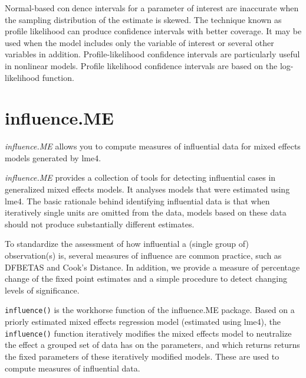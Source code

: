 \documentclass[12pt, a4paper]{report}
\theoremstyle{plain}
\theoremstyle{definition}
\theoremstyle{remark}
\begin{document}
	
	Normal-based condence intervals for a parameter of interest are inaccurate when the sampling 
	distribution of the estimate is skewed. The technique known as profile likelihood can produce confidence 
	intervals with better coverage. It may be used when the model includes only the variable of interest or 
	several other variables in addition.
	Profile-likelihood confidence intervals are particularly useful in nonlinear models. 
	Profile likelihood confidence intervals are based on the log-likelihood function.
	
	
	
	
	
	

	\section{influence.ME}
	
	\textit{influence.ME} allows you to compute measures of influential data for mixed effects models generated by lme4.
	
	\textit{influence.ME} provides a collection of tools for detecting influential cases in generalized mixed effects models. It analyses models that were estimated using lme4. The basic rationale behind identifying influential data is that when iteratively single units are omitted from the data, models based on these data should not produce substantially different estimates. 
	
	To standardize the assessment of how influential a (single group of) observation(s) is, several measures of influence are common practice, such as DFBETAS and Cook's Distance. In addition, we provide a measure of percentage change of the fixed point estimates and a simple procedure to detect changing levels of significance.
	
	\texttt{influence()} is the workhorse function of the influence.ME package. Based on a priorly estimated mixed effects regression model (estimated using lme4), the \texttt{influence()} function iteratively modifies the mixed effects model to neutralize the effect a grouped set of data has on the parameters, and which returns returns the fixed parameters of these iteratively modified models. These are used to compute measures of influential data.
	
\end{document}
